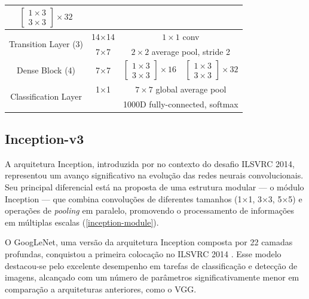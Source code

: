 \begin{table}[!htbp]
\begin{tabular}{|c|c|c|c|}
        $\left[\begin{array}{c}
        1 \times 3 \\
        3 \times 3
        \end{array}\right] \times 32$ \\
        \hline
        \multirow{2}{*}{Transition Layer (3)} & 14×14 & \multicolumn{2}{c|}{$1 \times 1$ conv} \\
        \cline{2-4}
        & 7×7 & \multicolumn{2}{c|}{$2 \times 2$ average pool, stride 2} \\
        \hline
        Dense Block (4) & 7×7 & 
        $\left[\begin{array}{c}
        1 \times 3 \\
        3 \times 3
        \end{array}\right] \times 16$ & 
        $\left[\begin{array}{c}
        1 \times 3 \\
        3 \times 3
        \end{array}\right] \times 32$ \\
        \hline
        \multirow{2}{*}{Classification Layer} & 1×1 & \multicolumn{2}{c|}{$7 \times 7$ global average pool} \\
        \cline{2-4}
        &  & \multicolumn{2}{c|}{1000D fully-connected, softmax} \\
        \hline
    \end{tabular}
    \label{tab:densenet-arch}
\end{table}

\subsection{Inception-v3}

A arquitetura Inception, introduzida por  no contexto do desafio ILSVRC 2014, representou um avanço significativo na evolução das redes neurais convolucionais. Seu principal diferencial está na proposta de uma estrutura modular — o módulo Inception — que combina convoluções de diferentes tamanhos (1×1, 3×3, 5×5) e operações de \textit{pooling} em paralelo, promovendo o processamento de informações em múltiplas escalas (\autoref{inception-module}).

O GoogLeNet, uma versão da arquitetura Inception composta por 22 camadas profundas, conquistou a primeira colocação no ILSVRC 2014 \cite{Russakovsky2015}. Esse modelo destacou-se pelo excelente desempenho em tarefas de classificação e detecção de imagens, alcançado com um número de parâmetros significativamente menor em comparação a arquiteturas anteriores, como o VGG.

